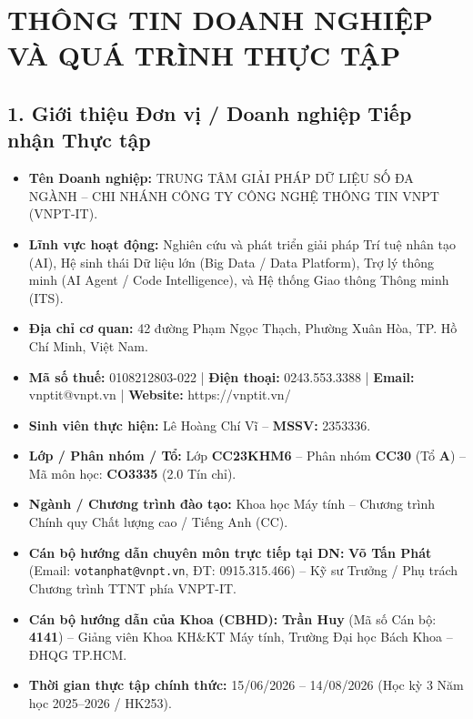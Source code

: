 \chapter*{THÔNG TIN DOANH NGHIỆP VÀ QUÁ TRÌNH THỰC TẬP}

\section*{1. Giới thiệu Đơn vị / Doanh nghiệp Tiếp nhận Thực tập}

\begin{itemize}[leftmargin=1.5cm, label=--]
  \item \textbf{Tên Doanh nghiệp:} TRUNG TÂM GIẢI PHÁP DỮ LIỆU SỐ ĐA NGÀNH -- CHI NHÁNH CÔNG TY CÔNG NGHỆ THÔNG TIN VNPT (VNPT-IT).
  \item \textbf{Lĩnh vực hoạt động:} Nghiên cứu và phát triển giải pháp Trí tuệ nhân tạo (AI), Hệ sinh thái Dữ liệu lớn (Big Data / Data Platform), Trợ lý thông minh (AI Agent / Code Intelligence), và Hệ thống Giao thông Thông minh (ITS).
  \item \textbf{Địa chỉ cơ quan:} 42 đường Phạm Ngọc Thạch, Phường Xuân Hòa, TP. Hồ Chí Minh, Việt Nam.
  \item \textbf{Mã số thuế:} 0108212803-022 | \textbf{Điện thoại:} 0243.553.3388 | \textbf{Email:} vnptit@vnpt.vn | \textbf{Website:} https://vnptit.vn/
  \item \textbf{Sinh viên thực hiện:} Lê Hoàng Chí Vĩ -- \textbf{MSSV:} 2353336.
  \item \textbf{Lớp / Phân nhóm / Tổ:} Lớp \textbf{CC23KHM6} -- Phân nhóm \textbf{CC30} (Tổ \textbf{A}) -- Mã môn học: \textbf{CO3335} (2.0 Tín chỉ).
  \item \textbf{Ngành / Chương trình đào tạo:} Khoa học Máy tính -- Chương trình Chính quy Chất lượng cao / Tiếng Anh (CC).
  \item \textbf{Cán bộ hướng dẫn chuyên môn trực tiếp tại DN:} \textbf{Võ Tấn Phát} (Email: \texttt{votanphat@vnpt.vn}, ĐT: 0915.315.466) -- Kỹ sư Trưởng / Phụ trách Chương trình TTNT phía VNPT-IT.
  \item \textbf{Cán bộ hướng dẫn của Khoa (CBHD):} \textbf{Trần Huy} (Mã số Cán bộ: \textbf{4141}) -- Giảng viên Khoa KH\&KT Máy tính, Trường Đại học Bách Khoa -- ĐHQG TP.HCM.
  \item \textbf{Thời gian thực tập chính thức:} 15/06/2026 -- 14/08/2026 (Học kỳ 3 Năm học 2025--2026 / HK253).
\end{itemize}

